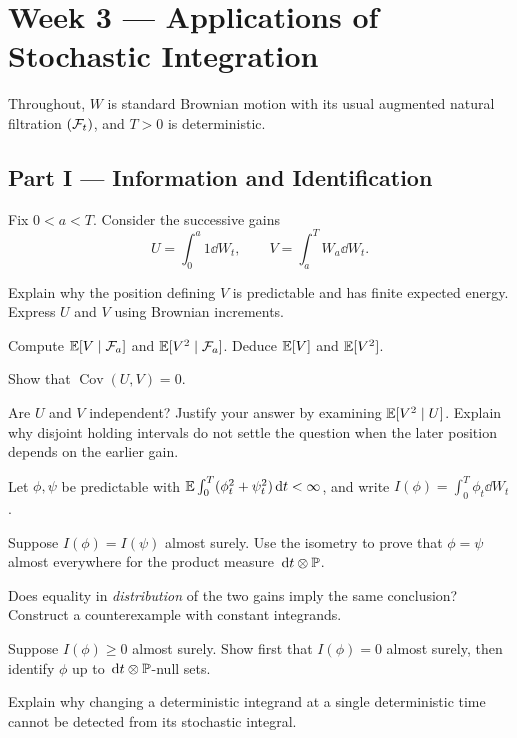 \section{Week 3 --- Applications of Stochastic Integration}

Throughout, \(W\) is standard Brownian motion with its usual augmented
natural filtration \((\mathcal{F}_t)\), and \(T>0\) is deterministic.

\subsection*{Part I --- Information and Identification}

\begin{exercise}
Fix \(0<a<T\). Consider the successive gains
\[
U=\int_0^a 1\dd W_t,
\qquad
V=\int_a^T W_a\dd W_t.
\]
\begin{exparts}
  \item Explain why the position defining \(V\) is predictable and has
  finite expected energy. Express \(U\) and \(V\) using Brownian increments.
  \item Compute \(\mathbb{E}[V\mid\mathcal{F}_a]\) and \(\mathbb{E}[V^2\mid\mathcal{F}_a]\).
  Deduce \(\mathbb{E}[V]\) and \(\mathbb{E}[V^2]\).
  \item Show that \(\operatorname{Cov}(U,V)=0\).
  \item Are \(U\) and \(V\) independent? Justify your answer by examining
  \(\mathbb{E}[V^2\mid U]\). Explain why disjoint holding intervals do not settle
  the question when the later position depends on the earlier gain.
\end{exparts}
\end{exercise}

\begin{exercise}
Let \(\phi,\psi\) be predictable with
\(\mathbb{E}\int_0^T(\phi_t^2+\psi_t^2)\,\mathrm{d} t<\infty\), and write
\(I(\phi)=\int_0^T\phi_t\dd W_t\).
\begin{exparts}
  \item Suppose \(I(\phi)=I(\psi)\) almost surely. Use the isometry to
  prove that \(\phi=\psi\) almost everywhere for the product measure
  \(\,\mathrm{d} t\otimes\mathbb{P}\).
  \item Does equality in \emph{distribution} of the two gains imply the
  same conclusion? Construct a counterexample with constant integrands.
  \item Suppose \(I(\phi)\geq0\) almost surely. Show first that
  \(I(\phi)=0\) almost surely, then identify \(\phi\) up to
  \(\,\mathrm{d} t\otimes\mathbb{P}\)-null sets.
  \item Explain why changing a deterministic integrand at a single
  deterministic time cannot be detected from its stochastic integral.
\end{exparts}
\end{exercise}

